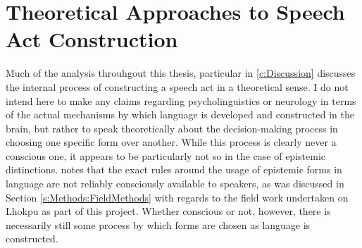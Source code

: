 \section{Theoretical Approaches to Speech Act Construction}\label{ss:Discussion:SpeechActs}
Much of the analysis throuhgout this thesis, particular in \cref{c:Discussion} discusses the internal process of constructing a speech act in a theoretical sense. I do not intend here to make any claims regarding psycholinguistics or neurology in terms of the actual mechanisms by which language is developed and constructed in the brain, but rather to speak theoretically about the decision-making process in choosing one specific form over another. While this process is clearly never a conscious one, it appears to be particularly not so in the case of epistemic distinctions.  notes that the exact rules around the usage of epistemic forms in language are not reliably consciously available to speakers, as was discussed in Section \ref{s:Methods:FieldMethods} with regards to the field work undertaken on Lhokpu as part of this project. Whether conscious or not, however, there is necessarily still some process by which forms are chosen as language is constructed.

